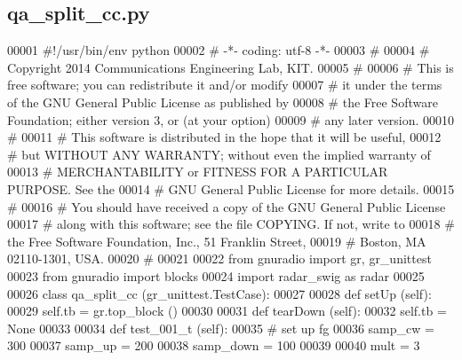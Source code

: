 \subsection{qa\+\_\+split\+\_\+cc.\+py}
\label{qa__split__cc_8py_source}

\begin{DoxyCode}
00001 \textcolor{comment}{#!/usr/bin/env python}
00002 \textcolor{comment}{# -*- coding: utf-8 -*-}
00003 \textcolor{comment}{# }
00004 \textcolor{comment}{# Copyright 2014 Communications Engineering Lab, KIT.}
00005 \textcolor{comment}{# }
00006 \textcolor{comment}{# This is free software; you can redistribute it and/or modify}
00007 \textcolor{comment}{# it under the terms of the GNU General Public License as published by}
00008 \textcolor{comment}{# the Free Software Foundation; either version 3, or (at your option)}
00009 \textcolor{comment}{# any later version.}
00010 \textcolor{comment}{# }
00011 \textcolor{comment}{# This software is distributed in the hope that it will be useful,}
00012 \textcolor{comment}{# but WITHOUT ANY WARRANTY; without even the implied warranty of}
00013 \textcolor{comment}{# MERCHANTABILITY or FITNESS FOR A PARTICULAR PURPOSE.  See the}
00014 \textcolor{comment}{# GNU General Public License for more details.}
00015 \textcolor{comment}{# }
00016 \textcolor{comment}{# You should have received a copy of the GNU General Public License}
00017 \textcolor{comment}{# along with this software; see the file COPYING.  If not, write to}
00018 \textcolor{comment}{# the Free Software Foundation, Inc., 51 Franklin Street,}
00019 \textcolor{comment}{# Boston, MA 02110-1301, USA.}
00020 \textcolor{comment}{# }
00021 
00022 \textcolor{keyword}{from} gnuradio \textcolor{keyword}{import} gr, gr\_unittest
00023 \textcolor{keyword}{from} gnuradio \textcolor{keyword}{import} blocks
00024 \textcolor{keyword}{import} radar\_swig \textcolor{keyword}{as} radar
00025 
00026 \textcolor{keyword}{class }qa_split_cc (gr\_unittest.TestCase):
00027 
00028     \textcolor{keyword}{def }setUp (self):
00029         self.tb = gr.top\_block ()
00030 
00031     \textcolor{keyword}{def }tearDown (self):
00032         self.tb = \textcolor{keywordtype}{None}
00033 
00034     \textcolor{keyword}{def }test_001_t (self):
00035         \textcolor{comment}{# set up fg}
00036         samp\_cw = 300
00037         samp\_up = 200
00038         samp\_down = 100
00039         
00040         mult = 3

\end{DoxyCode}
